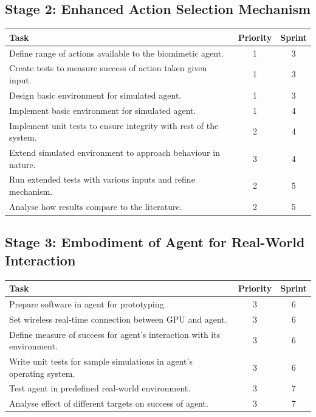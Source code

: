\documentclass[a4paper,11pt]{article}
\begin{document}
\subsection{Stage 2: Enhanced Action Selection Mechanism}
\begin{center}
    \begin{tabular}{p{12cm} c c}
    \textbf{Task} & \textbf{Priority} & \textbf{Sprint} \\ \hline
	Define range of actions available to the biomimetic agent. & 1 & 3 \\
	Create tests to measure success of action taken given input. & 1 & 3 \\ 
	Design basic environment for simulated agent. & 1 & 3 \\
	Implement basic environment for simulated agent. & 1 & 4 \\
	Implement unit tests to ensure integrity with rest of the system. & 2 & 4 \\
	Extend simulated environment to approach behaviour in nature. & 3 & 4 \\
	Run extended tests with various inputs and refine mechanism. & 2 & 5 \\
	Analyse how results compare to the literature. & 2 & 5 \\
    \end{tabular}
\end{center}

\subsection{Stage 3: Embodiment of Agent for Real-World Interaction}
\begin{center}
    \begin{tabular}{p{12cm} c c}
    \textbf{Task} & \textbf{Priority} & \textbf{Sprint} \\ \hline
	Prepare software in agent for prototyping. & 3 & 6 \\
	Set wireless real-time connection between GPU and agent. & 3 & 6 \\
	Define measure of success for agent's interaction with its environment. & 3 & 6 \\
	Write unit tests for sample simulations in agent's operating system. & 3 & 6 \\
	Test agent in predefined real-world environment. & 3 & 7 \\
	Analyse effect of different targets on success of agent. & 3 & 7 \\
    \end{tabular}
\end{center}	
\end{document}
